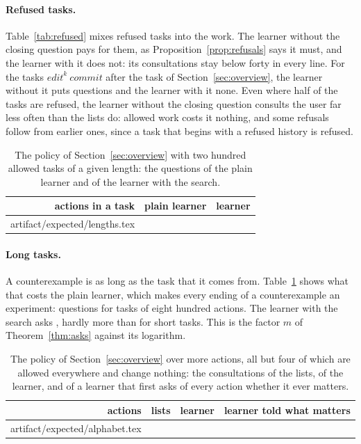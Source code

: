 \documentclass[acmsmall,nonacm,screen]{acmart}
\makeatletter
\newcommand{\nm}[1]{\mathit{#1}}
\newcommand{\edit}{\nm{edit}}
\newcommand{\commit}{\nm{commit}}
\newcommand{\claim}[2]{#2}
\newcommand{\rows}[1]{\@@input artifact/expected/#1.tex }
\makeatother
\begin{document}
\paragraph{Refused tasks.} \claim{refused}{Table~\ref{tab:refused} mixes refused tasks into
the work. The learner without the closing question pays for them, as
Proposition~\ref{prop:refusals} says it must, and the learner with it does not: its
consultations stay below forty in every line. For the \exChain{} tasks $\edit^k\ \commit$
after the task of Section~\ref{sec:overview}, the learner without it puts \exChainPaid{}
questions and the learner with it none.} Even where half of the tasks are refused, the learner without the closing
question consults the user far less often than the lists do: allowed work costs it nothing,
and some refusals follow from earlier ones, since a task that begins with a refused history
is refused.

\begin{table}
\caption{The policy of Section~\ref{sec:overview} with two hundred allowed tasks of a given
length: the questions of the plain learner and of the learner with the search.}
\label{tab:lengths}
\small
\begin{tabular}{rrr}
\toprule
actions in a task & plain learner & learner \\
\midrule
\rows{lengths}
\bottomrule
\end{tabular}
\end{table}

\paragraph{Long tasks.} A counterexample is as long as the task that it comes from.
\claim{lengths}{Table~\ref{tab:lengths} shows what that costs the plain learner, which makes
every ending of a counterexample an experiment: \exLengthPlain{} questions for tasks of eight
hundred actions. The learner with the search asks \exLengthSearch{}, hardly more than for
short tasks.} This is the factor $m$ of Theorem~\ref{thm:asks} against its logarithm.

\begin{table}
\caption{The policy of Section~\ref{sec:overview} over more actions, all but four of which
are allowed everywhere and change nothing: the consultations of the lists, of the learner,
and of a learner that first asks of every action whether it ever matters.}
\label{tab:alphabet}
\small
\begin{tabular}{rrrr}
\toprule
actions & lists & learner & learner told what matters \\
\midrule
\rows{alphabet}
\bottomrule
\end{tabular}
\end{table}
\end{document}
